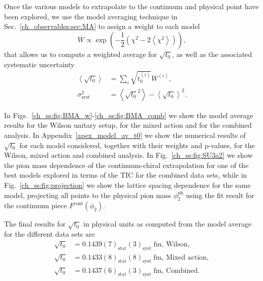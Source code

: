Once the various models to extrapolate to the continuum and physical point have been explored, we use the model averaging technique in Sec.~\ref{ch_observables:sec:MA} to assign a weight to each model 
\begin{equation}
\label{ch_ss:eq:W}
W\propto\exp\left(-\frac{1}{2}\left(\chi^2-2\left<\chi^2\right>\right)\right),
\end{equation}
that allows us to compute a weighted average for $\sqrt{t_0}$, as well as the associated systematic uncertainty
\begin{align}
\left<\sqrt{t_0}\right>&=\sum_i\sqrt{t_0^{(i)}}W^{(i)},\\
\sigma^2_{\textrm{syst}}&=\left<\sqrt{t_0}^2\right>-\left<\sqrt{t_0}\right>^2.
\end{align}

In Figs.~\ref{ch_ss:fig:BMA_w}-\ref{ch_ss:fig:BMA_comb} we show the model average results for the Wilson unitary setup, for the mixed action and for the combined analysis. In Appendix~\ref{apex_model_av_t0} we show the numerical results of $\sqrt{t_0}$ for each model considered, together with their weights and p-values, for the Wilson, mixed action and combined analysis. In Fig.~\ref{ch_ss:fig:SU3a2} we show the pion mass dependence of the continuum-chiral extrapolation for one of the best models explored in terms of the TIC for the combined data sets, while in Fig.~\ref{ch_ss:fig:projection} we show the lattice spacing dependence for the same model, projecting all points to the physical pion mass $\phi_2^{\textrm{ph}}$ using the fit result for the continuum piece $F^{\textrm{cont}}(\phi_2)$.

The final results for $\sqrt{t_0}$ in physical units as computed from the model average for the different data sets are
\begin{align}
\label{ch_ss:eq:t0ph}
\sqrt{t_0}&=0.1439(7)_{\textrm{stat}}(3)_{\textrm{syst}}\;\textrm{fm, Wilson}, \\
\sqrt{t_0}&=0.1433(8)_{\textrm{stat}}(8)_{\textrm{syst}}\;\textrm{fm, Mixed action}, \\
\sqrt{t_0}&=0.1437(6)_{\textrm{stat}}(3)_{\textrm{syst}}\;\textrm{fm, Combined}.
\end{align}

